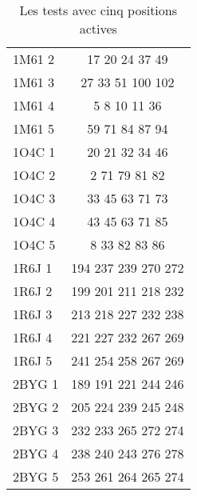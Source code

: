 \begin{table}[!htbp]
\begin{tabular}{lc}
        1M61 2 & 17 20 24 37 49 \\
        1M61 3 & 27 33 51 100 102 \\
        1M61 4 & 5 8 10 11 36 \\
        1M61 5 & 59 71 84 87 94 \\
        1O4C 1 & 20 21 32 34 46 \\
        1O4C 2 & 2 71 79 81 82 \\
        1O4C 3 & 33 45 63 71 73 \\
        1O4C 4 & 43 45 63 71 85 \\
        1O4C 5 & 8 33 82 83 86 \\
        1R6J 1 & 194 237 239 270 272 \\
        1R6J 2 & 199 201 211 218 232 \\
        1R6J 3 & 213 218 227 232 238 \\
        1R6J 4 & 221 227 232 267 269 \\
        1R6J 5 & 241 254 258 267 269 \\
        2BYG 1 & 189 191 221 244 246 \\
        2BYG 2 & 205 224 239 245 248 \\
        2BYG 3 & 232 233 265 272 274 \\
        2BYG 4 & 238 240 243 276 278 \\
        2BYG 5 & 253 261 264 265 274 \\

        \bottomrule

      \end{tabular}      
      \caption{Les tests avec cinq positions actives}
\label{tab:test5}      
    \end{table}



